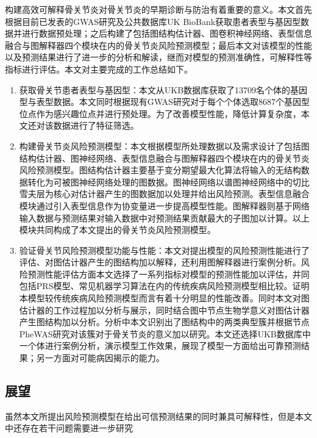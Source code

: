 \documentclass[
]{article}
\begin{document}
构建高效可解释骨关节炎对骨关节炎的早期诊断与防治有着重要的意义。本文首先根据目前已发表的GWAS研究及公共数据库UK
BioBank获取患者表型与基因型数据并进行数据预处理；之后构建了包括图结构估计器、图卷积神经网络、表型信息融合与图解释器四个模块在内的骨关节炎风险预测模型；最后本文对该模型的性能以及预测结果进行了进一步的分析和解读，继而对模型的预测准确性，可解释性等指标进行评估。本文对主要完成的工作总结如下。

\begin{enumerate}
\def\labelenumi{\arabic{enumi}.}
\item
  获取骨关节患者表型与基因型：本文从UKB数据库获取了13709名个体的基因型与表型数据。本文同时根据现有GWAS研究对于每个个体选取8687个基因型位点作为感兴趣位点并进行预处理。为了改善模型性能，降低计算复杂度，本文还对该数据进行了特征筛选。
\item
  构建骨关节炎风险预测模型：本文根据模型所处理数据以及需求设计了包括图结构估计器、图神经网络、表型信息融合与图解释器四个模块在内的骨关节炎风险预测模型。图结构估计器主要基于变分期望最大化算法将输入的无结构数据转化为可被图神经网络处理的图数据。图神经网络以谱图神经网络中的切比雪夫层为核心对估计器产生的图数据加以处理并给出风险预测。表型信息融合模块通过引入表型信息作为协变量进一步提高模型性能。图解释器则基于网络输入数据与预测结果对输入数据中对预测结果贡献最大的子图加以计算。以上模块共同构成了本文提出的骨关节炎风险预测模型。
\item
  验证骨关节风险预测模型功能与性能：本文对提出模型的风险预测性能进行了评估、对图估计器产生的图结构加以解释，还利用图解释器进行案例分析。风险预测性能评估方面本文选择了一系列指标对模型的预测性能加以评估，并同包括PRS模型、常见机器学习算法在内的传统疾病风险预测模型相比较。证明本模型较传统疾病风险预测模型而言有着十分明显的性能改善。同时本文对图估计器的工作过程加以分析与展示，同时结合图中节点生物学意义对图估计器产生图结构加以分析。分析中本文识别出了图结构中的两类典型簇并根据节点PheWAS研究对该簇对于骨关节炎的意义加以研究。本文还选择UKB数据库中一个体进行案例分析，演示模型工作效果，展现了模型一方面给出可靠预测结果；另一方面对可能病因揭示的能力。
\end{enumerate}

\hypertarget{ux5c55ux671b}{%
\subsection{展望}\label{ux5c55ux671b}}

虽然本文所提出风险预测模型在给出可信预测结果的同时兼具可解释性，但是本文中还存在若干问题需要进一步研究
\end{document}
